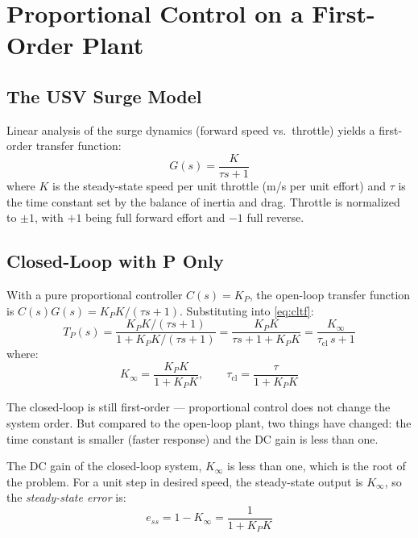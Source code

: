 \documentclass[../../book.tex]{subfiles}
\begin{document}
\section{Proportional Control on a First-Order Plant}
\label{sec:pcontrol}

\subsection{The USV Surge Model}

Linear analysis of the surge dynamics (forward speed vs.\ throttle) yields a
first-order transfer function:
\begin{equation}
  G(s) = \frac{K}{\tau s + 1}
  \label{eq:surge_plant}
\end{equation}
where $K$ is the steady-state speed per unit throttle (m/s per unit effort)
and $\tau$ is the time constant set by the balance of inertia and drag.
Throttle is normalized to $\pm 1$, with $+1$ being full forward effort and
$-1$ full reverse.

\subsection{Closed-Loop with P Only}

With a pure proportional controller $C(s) = K_P$, the open-loop transfer
function is $C(s)G(s) = K_P K/(\tau s + 1)$.  Substituting into
\cref{eq:cltf}:
\begin{equation}
  T_P(s) = \frac{K_P K/(\tau s+1)}{1 + K_P K/(\tau s+1)}
          = \frac{K_P K}{\tau s + 1 + K_P K}
          = \frac{K_\infty}{\tau_\mathrm{cl}\,s + 1}
  \label{eq:cl_p}
\end{equation}
where:
\begin{equation}
  K_\infty = \frac{K_P K}{1 + K_P K}, \qquad
  \tau_\mathrm{cl} = \frac{\tau}{1 + K_P K}
  \label{eq:p_params}
\end{equation}

The closed-loop is still first-order --- proportional control does not change
the system order.  But compared to the open-loop plant, two things have
changed: the time constant is smaller (faster response) and the DC gain is
less than one.

The DC gain of the closed-loop system, $K_\infty$ is less than one, which is the root of the problem.  For a unit step in
desired speed, the steady-state output is $K_\infty$, so the
\emph{steady-state error} is:
\begin{equation}
  e_{ss} = 1 - K_\infty = \frac{1}{1 + K_P K}
  \label{eq:p_error}
\end{equation}
\end{document}
